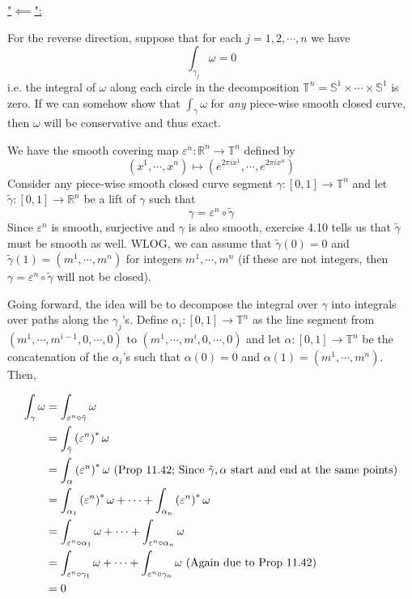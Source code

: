 \documentclass{article}
\newcommand{\R}{\mathbb{R}}
\begin{document}
\vskip 0.5cm
\underline{"$\impliedby$":} 

For the reverse direction, suppose that for each $j = 1, 2, \cdots, n$ we have \[ \int_{{\gamma_j}} \omega = 0 \] i.e. the integral of $\omega$ along each circle in the decomposition $\mathbb{T}^n = \mathbb{S}^1 \times \cdots \times \mathbb{S}^1$ is zero. If we can somehow show that $\int_{\gamma} \omega$ for \emph{any} piece-wise smooth closed curve, then $\omega$ will be conservative and thus exact.

\vskip 0.5cm
We have the smooth covering map $\varepsilon^n : \R^n \rightarrow \mathbb{T}^n$ defined by \[ \left(x^1, \cdots, x^n \right) \mapsto \left(e^{2\pi i x^1}, \cdots, e^{2\pi i x^n}\right) \] Consider any piece-wise smooth closed curve segment $\gamma : [0, 1] \rightarrow \mathbb{T}^n$ and let $\tilde{\gamma} : [0, 1] \rightarrow \R^n$ be a lift of $\gamma$ such that \[  \gamma = \varepsilon^n \circ \tilde{\gamma}   \] Since $\varepsilon^n$ is smooth, surjective and $\gamma$ is also smooth, exercise 4.10 tells us that $\tilde{\gamma}$ must be smooth as well. WLOG, we can assume that $\tilde{\gamma}(0) = 0$ and $\tilde{\gamma}(1) = \left(m^1, \cdots, m^n\right)$ for integers $m^1, \cdots, m^n$ (if these are not integers, then $\gamma = \varepsilon^n \circ \tilde{\gamma}$ will not be closed).

\vskip 0.5cm
Going forward, the idea will be to decompose the integral over $\gamma$ into integrals over paths along the $\gamma_j$'s. Define $\alpha_i : [0, 1] \rightarrow \mathbb{T}^n$ as the line segment from $\left(m^1, \cdots, m^{i-1}, 0, \cdots, 0\right)$ to $\left(m^1, \cdots, m^{i}, 0, \cdots, 0\right)$ and let $\alpha : [0, 1] \rightarrow \mathbb{T}^n$ be the concatenation of the $\alpha_i$'s such that $\alpha(0) = 0$ and $\alpha(1) = \left(m^1, \cdots, m^n\right)$. Then, 

\begin{align*}
  \int_{\gamma} \omega &= \int_{{\varepsilon^n \circ \tilde{\gamma} }} \omega \\
  &= \int_{ \tilde{\gamma} } \left(\varepsilon^n\right)^* \omega \\
  &= \int_{\alpha} \left(\varepsilon^n\right)^* \omega \text{  (Prop 11.42; Since $ \tilde{\gamma}, \alpha$ start and end at the same points)} \\
  &= \int_{{\alpha_1}} \left(\varepsilon^n\right)^* \omega + \cdots + \int_{{\alpha_n}} \left(\varepsilon^n\right)^* \omega \\
  &= \int_{\varepsilon^n \circ {\alpha_1}} \omega + \cdots + \int_{\varepsilon^n \circ {\alpha_n}} \omega \\
  &= \int_{\varepsilon^n \circ {\gamma_1}} \omega + \cdots + \int_{\varepsilon^n \circ {\gamma_n}} \omega \text{ (Again due to Prop 11.42)}\\
  &= 0
\end{align*}
\end{document}
